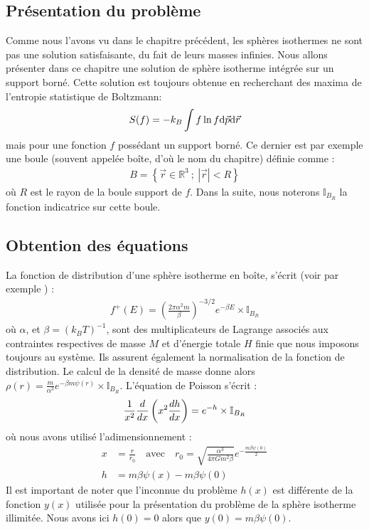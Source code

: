 \subsection{Présentation du problème}
	Comme nous l'avons vu dans le chapitre précédent, les sphères isothermes ne sont pas une solution satisfaisante, du fait de leurs masses infinies.
	Nous allons présenter dans ce chapitre une solution de sphère isotherme intégrée sur un support borné. Cette solution est toujours obtenue en recherchant des maxima  de l'entropie statistique de Boltzmann:
	\begin{align*}
		S(f) = - k_B \int f \ln f \mathrm{d}\vec{p}\mathrm{d}\vec{r}
	\end{align*}
	mais pour une fonction $f$ possédant un support borné. Ce dernier est par exemple une boule (souvent appelée boîte, d'où le nom du chapitre) définie comme :
	\begin{align}
		B = \left\{ \vec{r} \in \mathbb{R}^3\ ;\ \left|\vec{r}\right| < R\right\}
	\end{align}
	où $R$ est le rayon de la boule support de $f$. Dans la suite, nous noterons $\mathbb{I}_{B_R}$ la fonction indicatrice sur cette boule.

\subsection{Obtention des équations}
	La fonction de distribution d'une sphère isotherme en boîte, s'écrit (voir par exemple \cite{CoursJP}) :
	\begin{align}
		f^+(E) = \left(\frac{2\pi\alpha^2m}{\beta}\right)^{-3/2}e^{-\beta E}\times\mathbb{I}_{B_R}
	\end{align}
	où $\alpha$, et $\beta=(k_B T)^{-1}$, sont des multiplicateurs de Lagrange
	associés aux
	contraintes respectives de masse $M$ et d'énergie totale $H$ finie que nous imposons toujours au système.
	Ils assurent également la normalisation de la fonction de distribution.
	Le calcul de la densité de masse donne alors \mbox{$\rho(r) = \frac{m}{\alpha^3}e^{-\beta m \psi(r)}\times\mathbb{I}_{B_R}$}. %
	L'équation de Poisson s'écrit :
	\begin{align}
		 \frac{1}{x^2}\frac{d}{dx}\left(x^2\frac{d h}{dx}\right) = e^{-h} \times\mathbb{I}_{B_R} \notag
	\end{align}
	où nous avons utilisé l'adimensionnement  :
	\begin{align}
		x &= \frac{r}{r_0} \quad \mathrm{avec} \quad r_0 = \sqrt{\frac{\alpha^3}{4\pi G m^2\beta}}e^{-\frac{m\beta\psi(0)}{2}} \label{toto11} \\
		h &= m\beta\psi(x) - m\beta\psi(0) \label{toto12}
		\end{align}
		Il est important de noter que l'inconnue du problème $h(x)$ est différente de la fonction $y(x)$ utilisée pour la présentation du problème de la sphère isotherme illimitée. Nous avons ici $h(0) = 0$ alors que $y(0) = m\beta\psi(0)$.
		
